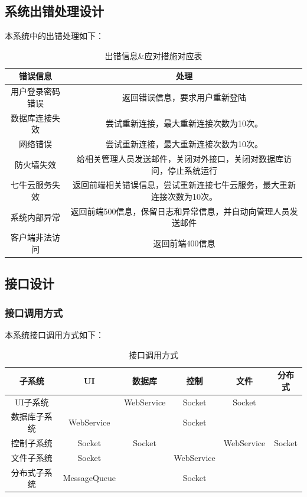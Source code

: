 \documentclass[UTF8]{ctexart}
\begin{document}
\subsection{系统出错处理设计}
本系统中的出错处理如下：
\begin{table}[H]
\centering
\caption{出错信息\&应对措施对应表}
\begin{tabular}{|c|c|}
\hline
错误信息 & 处理\\
\hline
用户登录密码错误 & 返回错误信息，要求用户重新登陆\\
数据库连接失效 & 尝试重新连接，最大重新连接次数为10次。\\
\hline
网络错误 & 尝试重新连接，最大重新连接次数为10次。\\
\hline
防火墙失效 &给相关管理人员发送邮件，关闭对外接口，关闭对数据库访问，停止系统运行 \\
\hline
七牛云服务失效 & 返回前端相关错误信息，尝试重新连接七牛云服务，最大重新连接次数为10次。 \\
\hline
系统内部异常 & 返回前端500信息，保留日志和异常信息，并自动向管理人员发送邮件 \\
\hline
客户端非法访问 & 返回前端400信息 \\
\hline
\end{tabular}
\end{table}
\subsection{接口设计}
\subsubsection{接口调用方式}
本系统接口调用方式如下：\\
\begin{table}[H]
\centering
\caption{接口调用方式}
\begin{tabular}{|c|c|c|c|c|c|}
\hline
子系统&UI&数据库&控制&文件&分布式\\
\hline
UI子系统& &WebService&Socket&Socket& \\
\hline
数据库子系统&WebService& &Socket& &  \\
\hline
控制子系统&Socket&Socket& &WebService&Socket \\
\hline
文件子系统&Socket& &WebService& & \\
\hline
分布式子系统&MessageQueue& &Socket& & \\
\hline
\end{tabular}
\end{table}
\end{document}

